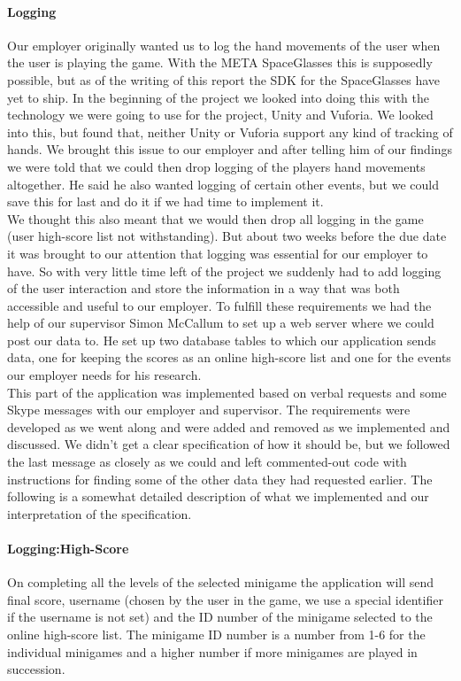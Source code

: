 \paragraph{Logging}
Our employer originally wanted us to log the hand movements of the user when the user is playing the game. With the META SpaceGlasses this is supposedly possible, but as of the writing of this report the SDK for the SpaceGlasses have yet to ship. In the beginning of the project we looked into doing this with the technology we were going to use for the project, Unity and Vuforia. We looked into this, but found that, neither Unity or Vuforia support any kind of tracking of hands. We brought this issue to our employer and after telling him of our findings we were told that we could then drop logging of the players hand movements altogether. He said he also wanted logging of certain other events, but we could save this for last and do it if we had time to implement it.
\\
We thought this also meant that we would then drop all logging in the game (user high-score list not withstanding). But about two weeks before the due date it was brought to our attention that logging was essential for our employer to have. So with very little time left of the project we suddenly had to add logging of the user interaction and store the information in a way that was both accessible and useful to our employer.
To fulfill these requirements we had the help of our supervisor Simon McCallum to set up a web server where we could post our data to. He set up two database tables to which our application sends data, one for keeping the scores as an online high-score list and one for the events our employer needs for his research.\\
This part of the application was implemented based on verbal requests and some Skype messages with our employer and supervisor. The requirements were developed as we went along and were added and removed as we implemented and discussed. We didn't get a clear specification of how it should be, but we followed the last message as closely as we could and left commented-out code with instructions for finding some of the other data they had requested earlier. The following is a somewhat detailed description of what we implemented and our interpretation of the specification.
\paragraph{Logging:High-Score}
On completing all the levels of the selected minigame the application will send final score, username (chosen by the user in the game, we use a special identifier if the username is not set) and the ID number of the minigame selected to the online high-score list. The minigame ID number is a number from 1-6 for the individual minigames and a higher number if more minigames are played in succession.

